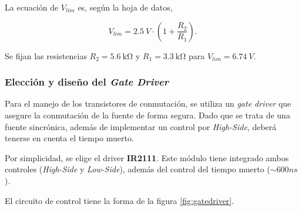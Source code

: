 \documentclass[]{article}
\begin{document}
La ecuación de $V_{lim}$ es, según la hoja de datos, 

\begin{equation}
	V_{lim} = \SI{2.5}{V} \cdot (1 + \frac{R_2}{R_1}).
\end{equation} 

Se fijan las resistencias $R_2 = \SI{5.6}{\kilo\ohm}$ y $R_1 = \SI{3.3}{\kilo\ohm}$ para $V_{lim} = \SI{6.74}{V}$.

	
	\subsubsection{Elección y diseño del \textit{Gate Driver}}
	Para el manejo de los transistores de conmutación, se utiliza un \textit{gate driver} que asegure la conmutación de la fuente de forma segura. Dado que se trata de una fuente sincrónica, además de implementar un control por \textit{High-Side}, deberá tenerse en cuenta el tiempo muerto.
	
	Por simplicidad, se elige el driver \textbf{IR2111}. Este módulo tiene integrado ambos controles (\textit{High-Side} y \textit{Low-Side}), además del control del tiempo muerto ($\sim 600\si{ns}$).
	
	El circuito de control tiene la forma de la figura \ref{fig:gatedriver}.
	
\end{document}
